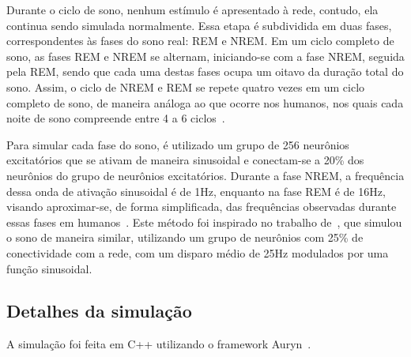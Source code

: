 Durante o ciclo de sono, nenhum estímulo é apresentado à rede, contudo, ela continua sendo simulada normalmente. Essa etapa é
subdividida em duas fases, correspondentes às fases do sono real: REM e NREM. Em um ciclo completo de sono, as fases REM e NREM se
alternam, iniciando-se com a fase NREM, seguida pela REM, sendo que cada uma destas fases ocupa um oitavo da duração total do
sono. Assim, o ciclo de NREM e REM se repete quatro vezes em um ciclo completo de sono, de maneira análoga ao que ocorre nos
humanos, nos quais cada noite de sono compreende entre 4 a 6 ciclos~\cite{patelPhysiology2023}.

Para simular cada fase do sono, é utilizado um grupo de 256 neurônios excitatórios que se ativam de maneira sinusoidal e
conectam-se a 20\% dos neurônios do grupo de neurônios excitatórios. Durante a fase NREM, a frequência dessa onda de ativação
sinusoidal é de 1Hz, enquanto na fase REM é de 16Hz, visando aproximar-se, de forma simplificada, das frequências observadas
durante essas fases em humanos~\cite{guoSlow2022, cowdinTheta2014}. Este método foi inspirado no trabalho de~, que
simulou o sono de maneira similar, utilizando um grupo de neurônios com 25\% de conectividade com a rede, com um disparo médio de
25Hz modulados por uma função sinusoidal.

\subsection{Detalhes da simulação}

A simulação foi feita em C++ utilizando o framework Auryn~\cite{zenkeLimits2014}.


